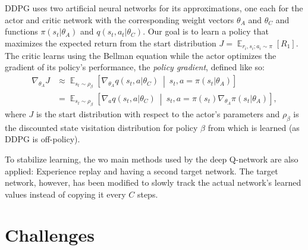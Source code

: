 \documentclass[a4paper,titlepage]{article}
\DeclareMathOperator{\Expectation}{\mathbb{E}}
\newcommand{\Exp}[3]{\Expectation_{#1} \left[ #2 \ \middle| \ #3 \right]}
\newcommand{\Ex}[2]{\Expectation_{#1} \left[ #2 \right]}
\begin{document}
DDPG uses two artificial neural networks for its approximations, one each for the actor and critic network with the corresponding weight vectors $\theta_A$ and $\theta_C$ and functions $\pi(s_t | \theta_A)$ and $q(s_t, a_t | \theta_C)$. Our goal is to learn a policy that maximizes the expected return from the start distribution $J = \Ex{r_i, s_i; a_i \sim \pi}{R_1}$. The critic learns using the Bellman equation while the actor optimizes the gradient of its policy's performance, the \emph{policy gradient}, defined like so:
\begin{align*}
  \nabla_{\theta_A} J &\approx \Exp{s_t \sim \rho_\beta}{\nabla_{\theta_A} q(s_t, a | \theta_C)}{s_t, a = \pi(s_t | \theta_A)} \\
  &= \Exp{s_t \sim \rho_\beta}{\nabla_a q(s_t, a | \theta_C)}{s_t, a = \pi(s_t) \nabla_{\theta_A} \pi(s_t | \theta_A)},
\end{align*}
where $J$ is the start distribution with respect to the actor's parameters and $\rho_\beta$ is the discounted state visitation distribution for policy $\beta$ from which is learned (as DDPG is off-policy).

To stabilize learning, the wo main methods used by the deep Q-network are also applied: Experience replay and having a second target network. The target network, however, has been modified to slowly track the actual network's learned values instead of copying it every $C$ steps.

\newpage

\section{Challenges}
\end{document}
